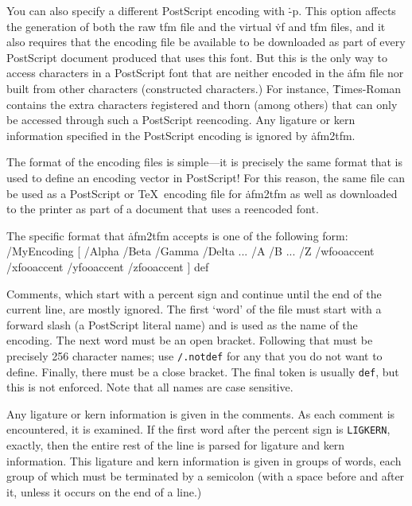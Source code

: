 You can also specify a different PostScript encoding with \.{-p}.  This
option affects the generation of both the raw \.{tfm} file and the
virtual \.{vf} and \.{tfm} files, and it also requires that the
encoding file be available to be downloaded as part of every
PostScript document produced that uses this font.  But this is the
only way to access characters in a PostScript font that are neither
encoded in the \.{afm} file nor built from other characters
(constructed characters.)  For instance, \.{Times-Roman} contains the
extra characters \.{registered} and \.{thorn} (among others) that
can only be accessed through such a PostScript reencoding.  Any ligature
or kern information specified in the PostScript encoding is ignored by
\.{afm2tfm}.

The format of the encoding files is simple---it is precisely the same
format that is used to define an encoding vector in PostScript!  For
this reason, the same file can be used as a PostScript or \TeX\
encoding file for \.{afm2tfm} as well as downloaded to the printer as
part of a document that uses a reencoded font.

The specific format that \.{afm2tfm} accepts is one of the following
form:
{\vskip0pt\parskip=0pt
/MyEncoding [ /Alpha /Beta /Gamma /Delta ...
     /A /B ... /Z %
     /wfooaccent /xfooaccent /yfooaccent /zfooaccent ] def
\endverb}

Comments, which start with a percent sign and continue until the
end of the current line, are mostly ignored.  The first `word' of
the file must start with a forward slash (a PostScript literal
name) and is used as the name of the encoding.  The next word must
be an open bracket.  Following that must be precisely 256 character
names; use {\tt /.notdef} for any that you do not want to define.
Finally, there must be a close bracket.  The final token is usually
{\tt def}, but this is not enforced.  Note that all names are
case sensitive.

Any ligature or kern information is given in the comments.  As each
comment is encountered, it is examined.  If the first word after the
percent sign is {\tt LIGKERN}, exactly, then the entire rest of the
line is parsed for ligature and kern information.  This ligature and
kern information is given in groups of words, each group of which must
be terminated by a semicolon (with a space before and after it, unless
it occurs on the end of a line.)

